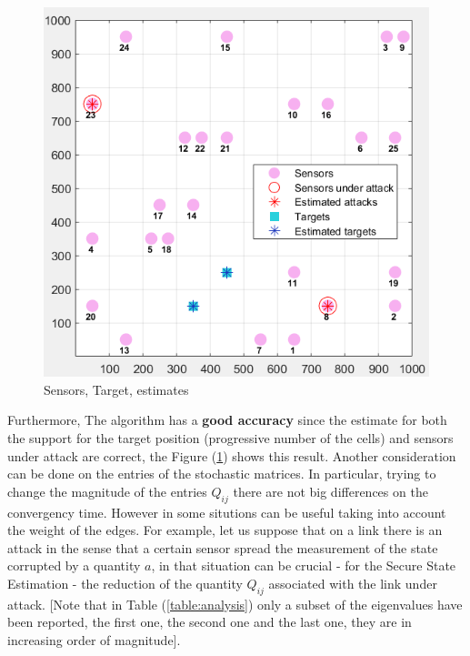 \begin{figure}
    \vspace{-0.3cm}
    \includegraphics[width=0.9\linewidth]{img/Room.png} 
    \caption{Sensors, Target, estimates}
    \label{fig:Room}
\end{figure}
Furthermore, The algorithm has a \textbf{good accuracy} since the estimate for both the support for the target position (progressive number of the cells) and sensors under attack are correct, the Figure (\ref{fig:Room}) shows this result.
Another consideration can be done on the entries of the stochastic matrices. In particular, trying to change the magnitude of the entries $Q_{ij}$ there are not big differences on the convergency time. However in some situtions can be useful taking into account the weight of the edges. For example, let us suppose that on a link there is an attack in the sense that a certain sensor spread the measurement of the state corrupted by a quantity $a$, in that situation can be crucial - for the Secure State Estimation - the reduction of the quantity $Q_{ij}$ associated with the link under attack. [Note that in Table (\ref{table:analysis}) only a subset of the eigenvalues have been reported, the first one, the second one and the last one, they are in increasing order of magnitude].

